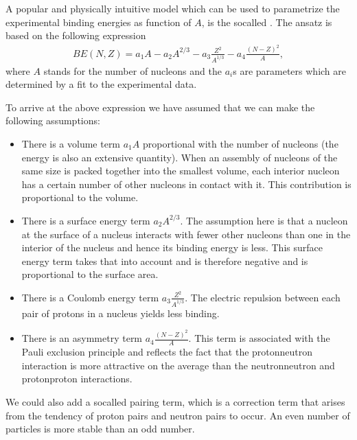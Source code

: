 \documentclass[letterpaper,10pt,english]{sphinxmanual}
\begin{document}
A popular and physically intuitive model which can be used to parametrize
the experimental binding energies as function of \(A\), is the so\sphinxhyphen{}called
. The ansatz is based on the following expression
\begin{equation*}
\begin{split}
BE(N,Z) = a_1A-a_2A^{2/3}-a_3\frac{Z^2}{A^{1/3}}-a_4\frac{(N-Z)^2}{A},
\end{split}
\end{equation*}
where \(A\) stands for the number of nucleons and the \(a_i\)s are parameters which are determined by a fit
to the experimental data.

To arrive at the above expression we have assumed that we can make the following assumptions:
\begin{itemize}
\item {} 
There is a volume term \(a_1A\) proportional with the number of nucleons (the energy is also an extensive quantity). When an assembly of nucleons of the same size is packed together into the smallest volume, each interior nucleon has a certain number of other nucleons in contact with it. This contribution is proportional to the volume.

\item {} 
There is a surface energy term \(a_2A^{2/3}\). The assumption here is that a nucleon at the surface of a nucleus interacts with fewer other nucleons than one in the interior of the nucleus and hence its binding energy is less. This surface energy term takes that into account and is therefore negative and is proportional to the surface area.

\item {} 
There is a Coulomb energy term \(a_3\frac{Z^2}{A^{1/3}}\). The electric repulsion between each pair of protons in a nucleus yields less binding.

\item {} 
There is an asymmetry term \(a_4\frac{(N-Z)^2}{A}\). This term is associated with the Pauli exclusion principle and reflects the fact that the proton\sphinxhyphen{}neutron interaction is more attractive on the average than the neutron\sphinxhyphen{}neutron and proton\sphinxhyphen{}proton interactions.

\end{itemize}

We could also add a so\sphinxhyphen{}called pairing term, which is a correction term that
arises from the tendency of proton pairs and neutron pairs to
occur. An even number of particles is more stable than an odd number.
\end{document}
